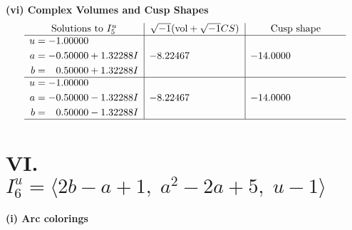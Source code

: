 \documentclass[1p]{elsarticle_modified}
\theoremstyle{definition}
\newcommand{\I}{\sqrt{-1}}
\begin{document}
\newpage\flushleft \textbf{(vi) Complex Volumes and Cusp Shapes}
$$\begin{array}{c|c|c}  
\text{Solutions to }I^u_{5}& \I (\text{vol} + \sqrt{-1}CS) & \text{Cusp shape}\\
 \hline 
\begin{aligned}
u &= -1.00000\phantom{ +0.000000I} \\
a &= -0.50000 + 1.32288 I \\
b &= \phantom{-}0.50000 + 1.32288 I\end{aligned}
 & -8.22467\phantom{ +0.000000I} & -14.0000\phantom{ +0.000000I} \\ \hline\begin{aligned}
u &= -1.00000\phantom{ +0.000000I} \\
a &= -0.50000 - 1.32288 I \\
b &= \phantom{-}0.50000 - 1.32288 I\end{aligned}
 & -8.22467\phantom{ +0.000000I} & -14.0000\phantom{ +0.000000I}\\
 \hline 
 \end{array}$$\newpage\newpage\renewcommand{\arraystretch}{1}
\centering \section*{VI. $I^u_{6}= \langle 2 b- a+1,\;a^2-2 a+5,\;u-1 \rangle$}
\flushleft \textbf{(i) Arc colorings}\\
\end{document}
